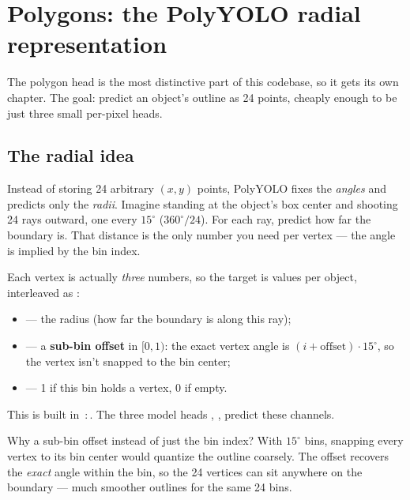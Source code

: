 \chapter{Polygons: the PolyYOLO radial representation}
\label{ch:polygons}

The polygon head is the most distinctive part of this codebase, so it gets its own
chapter. The goal: predict an object's outline as 24 points, cheaply enough to be just
three small per-pixel heads.

\section{The radial idea}
Instead of storing 24 arbitrary $(x,y)$ points, PolyYOLO fixes the \emph{angles} and
predicts only the \emph{radii}. Imagine standing at the object's box center and shooting
24 rays outward, one every $15^\circ$ ($360^\circ / 24$). For each ray, predict how far
the boundary is. That distance is the only number you need per vertex --- the angle is
implied by the bin index.


\begin{hood}
Each vertex is actually \emph{three} numbers, so the target is 
values per object, interleaved as :
\begin{itemize}[leftmargin=1.4em,itemsep=1pt]
  \item {} --- the radius (how far the boundary is along this ray);
  \item {} --- a \textbf{sub-bin offset} in $[0,1)$: the exact vertex angle is
        $(i + \text{offset})\cdot15^\circ$, so the vertex isn't snapped to the bin center;
  \item {} --- 1 if this bin holds a vertex, 0 if empty.
\end{itemize}
This is built in \,:\,. The three model
heads , ,  predict these channels.
\end{hood}

\begin{teacher}
Why a sub-bin offset instead of just the bin index? With $15^\circ$ bins, snapping every
vertex to its bin center would quantize the outline coarsely. The offset recovers the
\emph{exact} angle within the bin, so the 24 vertices can sit anywhere on the boundary ---
much smoother outlines for the same 24 bins.
\end{teacher}

